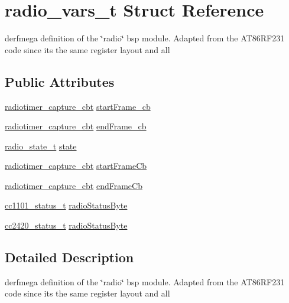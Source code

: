 \hypertarget{structradio__vars__t}{}\section{radio\+\_\+vars\+\_\+t Struct Reference}
\label{structradio__vars__t}


derfmega definition of the \char`\"{}radio\char`\"{} bsp module. Adapted from the A\+T86\+R\+F231 code since its the same register layout and all  


\subsection*{Public Attributes}
\begin{DoxyCompactItemize}
\item 
\hyperlink{group__radiotimer_gac7da641d0774aa21bfabefd560e42acf}{radiotimer\+\_\+capture\+\_\+cbt} \hyperlink{structradio__vars__t_a93a9acd7ac9beef0cdfdaa1d0c12a1e4}{start\+Frame\+\_\+cb}
\item 
\hyperlink{group__radiotimer_gac7da641d0774aa21bfabefd560e42acf}{radiotimer\+\_\+capture\+\_\+cbt} \hyperlink{structradio__vars__t_ab21d0657d3d50dfdb1242dc932ac1837}{end\+Frame\+\_\+cb}
\item 
\hyperlink{group__radio_ga756adac824be7fdeeac3026997c04711}{radio\+\_\+state\+\_\+t} \hyperlink{structradio__vars__t_a87f9e4910ac07bd530ec35fe2580d44c}{state}
\item 
\hyperlink{group__radiotimer_gac7da641d0774aa21bfabefd560e42acf}{radiotimer\+\_\+capture\+\_\+cbt} \hyperlink{structradio__vars__t_afa3b09ad5194f3dec3367efd63a3d0b7}{start\+Frame\+Cb}
\item 
\hyperlink{group__radiotimer_gac7da641d0774aa21bfabefd560e42acf}{radiotimer\+\_\+capture\+\_\+cbt} \hyperlink{structradio__vars__t_a363acb655556b282f5d707db5d23d11c}{end\+Frame\+Cb}
\item 
\hyperlink{structcc1101__status__t}{cc1101\+\_\+status\+\_\+t} \hyperlink{structradio__vars__t_a7131dc6eb71c55e51f182a17974b7acc}{radio\+Status\+Byte}
\item 
\hyperlink{structcc2420__status__t}{cc2420\+\_\+status\+\_\+t} \hyperlink{structradio__vars__t_acaaa3c9748e7c6052e42c5e294ac1070}{radio\+Status\+Byte}
\end{DoxyCompactItemize}


\subsection{Detailed Description}
derfmega definition of the \char`\"{}radio\char`\"{} bsp module. Adapted from the A\+T86\+R\+F231 code since its the same register layout and all 

